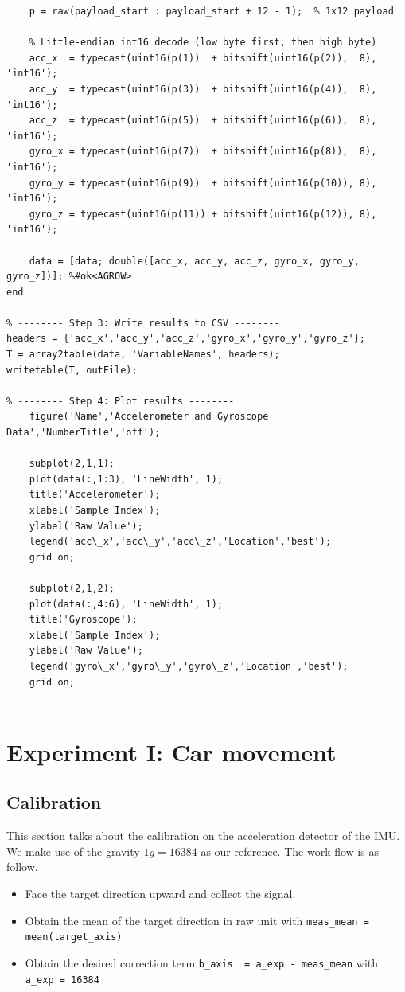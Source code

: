 \documentclass[10pt]{article}
\begin{document}
\begin{lstlisting}
    p = raw(payload_start : payload_start + 12 - 1);  % 1x12 payload

    % Little-endian int16 decode (low byte first, then high byte)
    acc_x  = typecast(uint16(p(1))  + bitshift(uint16(p(2)),  8), 'int16');
    acc_y  = typecast(uint16(p(3))  + bitshift(uint16(p(4)),  8), 'int16');
    acc_z  = typecast(uint16(p(5))  + bitshift(uint16(p(6)),  8), 'int16');
    gyro_x = typecast(uint16(p(7))  + bitshift(uint16(p(8)),  8), 'int16');
    gyro_y = typecast(uint16(p(9))  + bitshift(uint16(p(10)), 8), 'int16');
    gyro_z = typecast(uint16(p(11)) + bitshift(uint16(p(12)), 8), 'int16');

    data = [data; double([acc_x, acc_y, acc_z, gyro_x, gyro_y, gyro_z])]; %#ok<AGROW>
end

% -------- Step 3: Write results to CSV --------
headers = {'acc_x','acc_y','acc_z','gyro_x','gyro_y','gyro_z'};
T = array2table(data, 'VariableNames', headers);
writetable(T, outFile);

% -------- Step 4: Plot results --------
    figure('Name','Accelerometer and Gyroscope Data','NumberTitle','off');

    subplot(2,1,1);
    plot(data(:,1:3), 'LineWidth', 1);
    title('Accelerometer');
    xlabel('Sample Index');
    ylabel('Raw Value');
    legend('acc\_x','acc\_y','acc\_z','Location','best');
    grid on;

    subplot(2,1,2);
    plot(data(:,4:6), 'LineWidth', 1);
    title('Gyroscope');
    xlabel('Sample Index');
    ylabel('Raw Value');
    legend('gyro\_x','gyro\_y','gyro\_z','Location','best');
    grid on;
 
\end{lstlisting}

\pagebreak


\section{Experiment I: Car movement}
\subsection{Calibration}
This section talks about the calibration on the acceleration detector of the IMU. We make use of the gravity $1g = 16384$ as our reference.
The work flow is as follow,
\begin{itemize}
  \item[1] Face the target direction upward and collect the signal. 
  \item[2] Obtain the mean of the target direction in raw unit with \lstinline|meas_mean = mean(target_axis)|
  \item[3] Obtain the desired correction term \lstinline|b_axis  = a_exp - meas_mean| with  \lstinline|a_exp = 16384|
\end{itemize}
\end{document}

